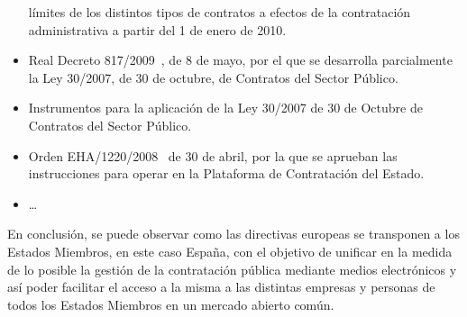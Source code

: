 \begin{itemize}
límites de los distintos tipos de contratos a efectos de la contratación administrativa a partir del 1 de enero de 2010.
\item Real Decreto 817/2009~\cite{rd817}, de 8 de mayo, por el que se desarrolla parcialmente la Ley 30/2007, de 30 de octubre, de Contratos del Sector Público. 
\item Instrumentos para la aplicación de la Ley 30/2007 de 30 de Octubre de Contratos del Sector Público.
\item Orden EHA/1220/2008~\cite{oEHA1220} de 30 de abril, por la que se aprueban las instrucciones 
para operar en la Plataforma de Contratación del Estado.
\item \ldots
\end{itemize}

En conclusión, se puede observar como las directivas europeas se transponen a los Estados Miembros,
en este caso España, con el objetivo de unificar en la medida de lo posible la gestión de la contratación pública
mediante medios electrónicos y así poder facilitar el acceso a la misma a las distintas empresas y personas de 
todos los \gls{Estados} Miembros en un mercado abierto común.

